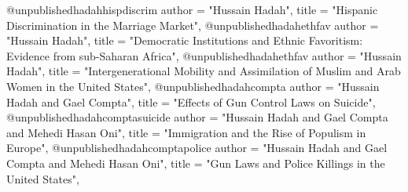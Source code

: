 @unpublished{hadahhispdiscrim
author = "Hussain Hadah",
title = "Hispanic Discrimination in the Marriage Market",
}
@unpublished{hadahethfav
author = "Hussain Hadah",
title = "Democratic Institutions and Ethnic Favoritism: Evidence from sub-Saharan Africa",
}
@unpublished{hadahethfav
author = "Hussain Hadah",
title = "Intergenerational Mobility and Assimilation of Muslim and Arab Women in the United States",
}
@unpublished{hadahcompta
author = "Hussain Hadah and Gael Compta",
title = "Effects of Gun Control Laws on Suicide",
}
@unpublished{hadahcomptasuicide
author = "Hussain Hadah and Gael Compta and Mehedi Hasan Oni",
title = "Immigration and the Rise of Populism in Europe",
}
@unpublished{hadahcomptapolice
author = "Hussain Hadah and Gael Compta and Mehedi Hasan Oni",
title = "Gun Laws and Police Killings in the United States",
}
